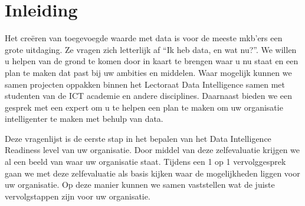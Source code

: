 \chapter{Inleiding}
Het creëren van toegevoegde waarde met data is voor de meeste mkb’ers een grote uitdaging. Ze vragen zich letterlijk af “Ik heb data, en wat nu?”. We willen u helpen van de grond te komen door in kaart te brengen waar u nu staat en een plan te maken dat past bij uw ambities en middelen. Waar mogelijk kunnen we samen projecten oppakken binnen het Lectoraat Data Intelligence samen met studenten van de ICT academie en andere disciplines. Daarnaast bieden we een gesprek met een expert om u te helpen een plan te maken om uw organisatie intelligenter te maken met behulp van data. 

Deze vragenlijst is de eerste stap in het bepalen van het Data Intelligence Readiness level van uw organisatie. Door middel van deze zelfevaluatie krijgen we al een beeld van waar uw organisatie staat. Tijdens een 1 op 1 vervolggesprek gaan we met deze zelfevaluatie als basis kijken waar de mogelijkheden liggen voor uw organisatie. Op deze manier kunnen we samen vaststellen wat de juiste vervolgstappen zijn voor uw organisatie.  